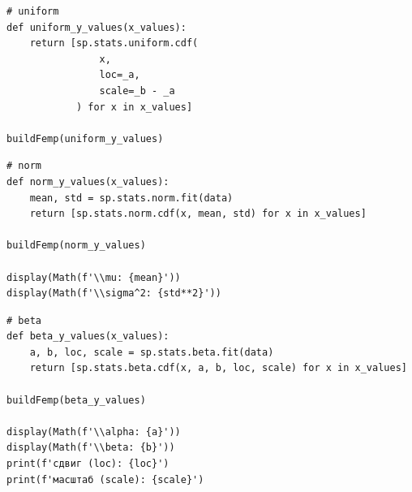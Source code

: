 \documentclass[a4paper, 14pt]{extarticle}
\begin{document}
\begin{lstlisting}[caption={нахождение значений y для uniform}, label={lst:16}]
# uniform
def uniform_y_values(x_values):
    return [sp.stats.uniform.cdf(
                x, 
                loc=_a, 
                scale=_b - _a
            ) for x in x_values]

buildFemp(uniform_y_values)
\end{lstlisting}

\begin{lstlisting}[caption={нахождение значений y для norm}, label={lst:17}]
# norm 
def norm_y_values(x_values):
    mean, std = sp.stats.norm.fit(data)
    return [sp.stats.norm.cdf(x, mean, std) for x in x_values]

buildFemp(norm_y_values)

display(Math(f'\\mu: {mean}'))
display(Math(f'\\sigma^2: {std**2}'))
\end{lstlisting}

\begin{lstlisting}[caption={нахождение значений y для beta}, label={lst:18}]
# beta 
def beta_y_values(x_values):
    a, b, loc, scale = sp.stats.beta.fit(data)
    return [sp.stats.beta.cdf(x, a, b, loc, scale) for x in x_values]

buildFemp(beta_y_values)

display(Math(f'\\alpha: {a}'))
display(Math(f'\\beta: {b}'))
print(f'сдвиг (loc): {loc}')
print(f'масштаб (scale): {scale}')
\end{lstlisting}
\end{document}
